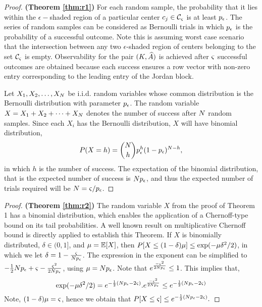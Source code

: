 \begin{proof}
	\textbf{(Theorem \ref{thm:r1})}
	For each random sample, the probability that it lies within the $ \epsilon- $shaded region of a particular center $ c_j \in \mathcal{C}_\varsigma$
	is at least $ p_{\epsilon} $. The series of random samples can be considered as Bernoulli trials in which $p_{\epsilon}$ is the probability of a successful outcome. Note this is assuming worst case scenario that the intersection between any two $ \epsilon $-shaded region of centers belonging to the set  $ \mathcal{C}_\varsigma $ is empty. Observability for the pair $ (K, \widehat{A}) $ is achieved after $ \varsigma  $ successful outcomes are obtained because each success ensures a row vector with non-zero entry corresponding to the leading entry of the Jordan block. 
	
	Let $ X_1, X_2, \dots, X_N $ be i.i.d. random variables whose common distribution is the Bernoulli distribution with parameter $p_{\epsilon}$. The random variable $ X = X_1 + X_2+ \dots+ X_N $ denotes the number of success after $ N $ random samples. Since each $ X_i $ has the Bernoulli distribution, $ X $ will have binomial distribution, 
	\begin{equation*}
	P(X=h) = {N \choose h}p_{\epsilon}^h (1-p_{\epsilon})^{N-h},
	\end{equation*}
	in which $ h  $ is the number of success. The expectation of the binomial distribution, that is the expected number of success is $ Np_{\epsilon} $, and thus the expected number of trials required will be $ N = \varsigma/p_{\epsilon}$.
\end{proof}
\begin{proof}
	\textbf{(Theorem \ref{thm:r2})}
	The random variable $ X $ from the proof of Theorem 1 has a binomial distribution, which enables the application of a Chernoff-type bound on its tail probabilities. A well known result  on multiplicative Chernoff bound \cite{motwani2010randomized} is directly applied to establish this Theorem. If $ X $ is binomially distributed, $ \delta \in (0,1] $, and $ \mu = \mathbb{E}[X] $, then $ P[X\leq(1-\delta)\mu] \leq \exp(-\mu \delta^2/2) $, in which we let $ \delta = 1-\frac{\varsigma}{N p_{\epsilon}}$.  The expression in the exponent can be simplified to $ -\frac{1}{2}N p_{\epsilon}+\varsigma - \frac{\varsigma^2}{2N p_{\epsilon}} $, using $ \mu = N p_{\epsilon} $. Note that $ e^{\frac{-\varsigma^2}{2N p_{\epsilon}}} \leq 1$. This implies that,
	\begin{equation*}
	\exp(-\mu \delta^2/2) =  e^{-\frac{1}{2}(N p_{\epsilon}-2\varsigma)}.e^{\frac{-\varsigma^2}{2N p_{\epsilon}}}\leq e^{-\frac{1}{2}(N p_{\epsilon}-2\varsigma)}
	\end{equation*}
	Note, $ (1-\delta)\mu = \varsigma $, hence we obtain that $ P[X\leq\varsigma] \leq e^{-\frac{1}{2}(N p_{\epsilon}-2\varsigma)}. $
\end{proof}
